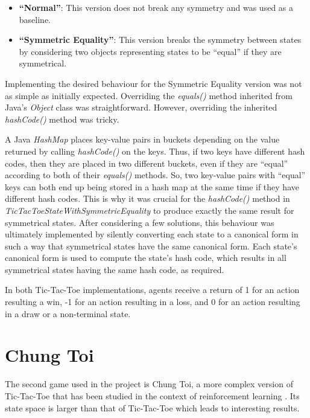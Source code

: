 \documentclass[11pt,a4paper]{report}
\begin{document}
\begin{itemize}

	\item \textbf{``Normal''}:
This version does not break any symmetry and was used as a baseline.

	\item \textbf{``Symmetric Equality''}: 
This version breaks the symmetry between states by considering two objects representing states to be ``equal'' if they are symmetrical.

\end{itemize}

Implementing the desired behaviour for the Symmetric Equality version was not as simple as initially expected. Overriding the \emph{equals()} method inherited from Java's \emph{Object} class was straightforward. However, overriding the inherited \emph{hashCode()} method was tricky.

A Java \emph{HashMap} places key-value pairs in buckets depending on the value returned by calling \emph{hashCode()} on the keys. Thus, if two keys have different hash codes, then they are placed in two different buckets, even if they are ``equal'' according to both of their \emph{equals()} methods. So, two key-value pairs with ``equal'' keys can both end up being stored in a hash map at the same time if they have different hash codes. This is why it was crucial for the \emph{hashCode()} method in \emph{TicTacToeStateWithSymmetricEquality} to produce exactly the same result for symmetrical states. After considering a few solutions, this behaviour was ultimately implemented by silently converting each state to a canonical form in such a way that symmetrical states have the same canonical form. Each state's canonical form is used to compute the state's hash code, which results in all symmetrical states having the same hash code, as required.

In both Tic-Tac-Toe implementations, agents receive a return of 1 for an action resulting a win, -1 for an action resulting in a loss, and 0 for an action resulting in a draw or a non-terminal state.


\section{Chung Toi}
\label{sec:ChungToi}

The second game used in the project is Chung Toi, a more complex version of Tic-Tac-Toe that has been studied in the context of reinforcement learning \cite{chung-toi-rl}. Its state space is larger than that of Tic-Tac-Toe which leads to interesting results.
\end{document}
